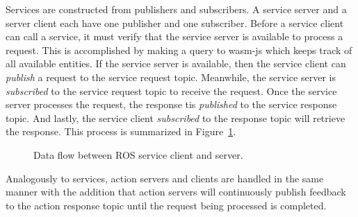     Services are constructed from publishers and subscribers. A service server and a server client each have one publisher and one subscriber. Before a service client can call a service, it must verify that the service server is available to process a request. This is accomplished by making a query to \textsf{wasm-js} which keeps track of all available entities. If the service server is available, then the service client can \textit{publish} a request to the service request topic. Meanwhile, the service server is \textit{subscribed} to the service request topic to receive the request. Once the service server processes the request, the response tis \textit{published} to the service response topic. And lastly, the service client \textit{subscribed} to the response topic will retrieve the response. This process is summarized in Figure~\ref{fig:service}.

    \begin{figure}[htbp]
        \caption{Data flow between \ac{ROS} service client and server.}
        \label{fig:service}
    \end{figure}

    Analogously to services, action servers and clients are handled in the same manner with the addition that action servers will continuously publish feedback to the action response topic until the request being processed is completed.

    


